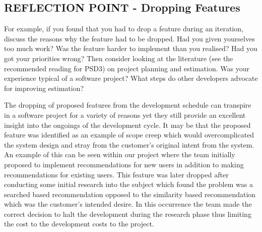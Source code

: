 \documentclass{l3proj}
\begin{document}
\subsection{REFLECTION POINT - Dropping Features}
\label{sec:droppingreflection}

For example, if you found that you had to drop a feature during an iteration, discuss the reasons why the feature had to be dropped. Had you given yourselves too much work? Was the feature harder to implement than you realised? Had you got your priorities wrong? Then consider looking at the literature (see the recommended reading for PSD3) on project planning and estimation. Was your experience typical of a software project? What steps do other developers advocate for improving estimation?


The dropping of proposed features from the development schedule can transpire in a software project for a variety of reasons yet they still provide an excellent insight into the ongoings of the development cycle. It may be that the proposed feature was identified as an example of scope creep which would overcomplicated the system design and stray from the customer's original intent from the system. An example of this can be seen within our project where the team initially proposed to implement recommendations for new users in addition to making recommendations for existing users. This feature was later dropped after conducting some initial research into the subject which found the problem was a searched based recommendation opposed to the similarity based recommendation which was the customer's intended desire. In this occurrence the team made the correct decision to halt the development during the research phase thus limiting the cost to the development costs to the project. 
\end{document}
